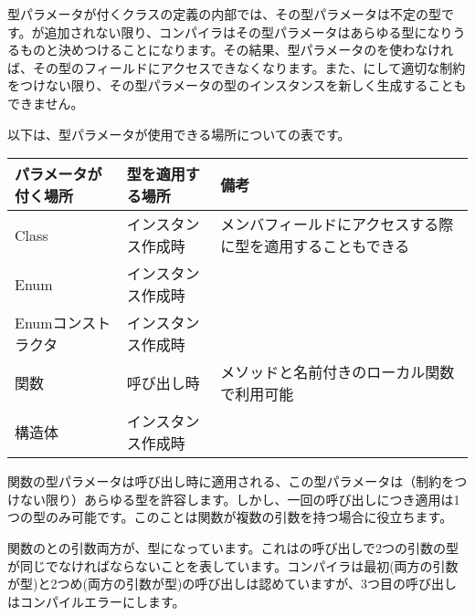 型パラメータが付くクラスの定義の内部では、その型パラメータは不定の型です。が追加されない限り、コンパイラはその型パラメータはあらゆる型になりうるものと決めつけることになります。その結果、型パラメータのを使わなければ、その型のフィールドにアクセスできなくなります。また、にして適切な制約をつけない限り、その型パラメータの型のインスタンスを新しく生成することもできません。

以下は、型パラメータが使用できる場所についての表です。

\begin{center}
\begin{tabular}{| l | l | l |}
	\hline
	パラメータが付く場所 & 型を適用する場所 & 備考 \\ \hline
	Class & インスタンス作成時 & メンバフィールドにアクセスする際に型を適用することもできる \\
	Enum & インスタンス作成時 & \\
	Enumコンストラクタ & インスタンス作成時 & \\
	関数 & 呼び出し時 & メソッドと名前付きのローカル関数で利用可能	\\
	構造体 & インスタンス作成時 & \\ \hline
\end{tabular}
\end{center}

関数の型パラメータは呼び出し時に適用される、この型パラメータは（制約をつけない限り）あらゆる型を許容します。しかし、一回の呼び出しにつき適用は1つの型のみ可能です。このことは関数が複数の引数を持つ場合に役立ちます。


関数のとの引数両方が、型になっています。これはの呼び出しで2つの引数の型が同じでなければならないことを表しています。コンパイラは最初(両方の引数が型)と2つめ(両方の引数が型)の呼び出しは認めていますが、3つ目の呼び出しはコンパイルエラーにします。


